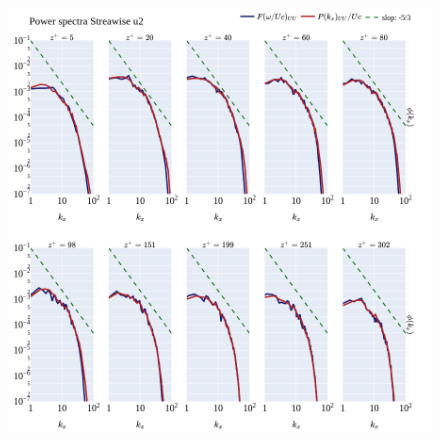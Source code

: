 \documentclass[]{article}
\theoremstyle{plain}
\theoremstyle{remark}
\begin{document}
\begin{figure}[H]
	\begin{center}
		\includegraphics[width=\textwidth]{../../output/figures/channel_wrles_retau395/split_time/frozen_turbulence/power_spectra/u2_all.png}
	\end{center}
\end{figure}
\end{document}
